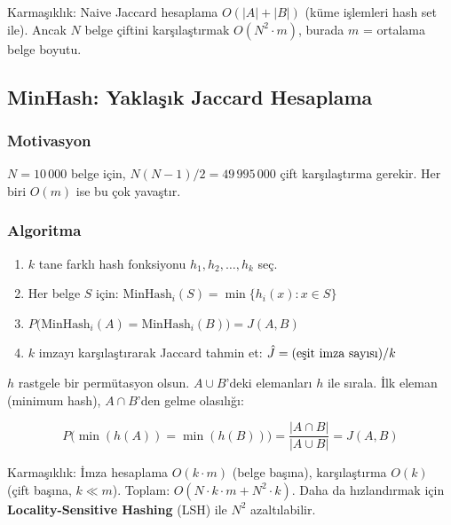 \noindent
Karma\c{s}{\i}kl{\i}k: Naive Jaccard hesaplama $O(|A| + |B|)$ (k\"{u}me i\c{s}lemleri hash set ile). Ancak $N$ belge \c{c}iftini kar\c{s}{\i}la\c{s}t{\i}rmak $O(N^2 \cdot m)$, burada $m$ = ortalama belge boyutu.


\subsection{MinHash: Yakla\c{s}{\i}k Jaccard Hesaplama}
\label{subsec:minhash}

\subsubsection{Motivasyon}

$N = 10\,000$ belge i\c{c}in, $N(N-1)/2 = 49\,995\,000$ \c{c}ift kar\c{s}{\i}la\c{s}t{\i}rma gerekir. Her biri $O(m)$ ise bu \c{c}ok yava\c{s}t{\i}r.

\subsubsection{Algoritma}

\begin{enumerate}
  \item $k$ tane farkl{\i} hash fonksiyonu $h_1, h_2, \ldots, h_k$ se\c{c}.
  \item Her belge $S$ i\c{c}in: $\text{MinHash}_i(S) = \min\{h_i(x) : x \in S\}$
  \item $P\!\big(\text{MinHash}_i(A) = \text{MinHash}_i(B)\big) = J(A, B)$
  \item $k$ imzay{\i} kar\c{s}{\i}la\c{s}t{\i}rarak Jaccard tahmin et: $\hat{J} = (\text{e\c{s}it imza say{\i}s{\i}}) / k$
\end{enumerate}

\begin{formulbox}
$h$ rastgele bir perm\"{u}tasyon olsun. $A \cup B$'deki elemanlar{\i} $h$ ile s{\i}rala. \.{I}lk eleman (minimum hash), $A \cap B$'den gelme olas{\i}l{\i}\u{g}{\i}:

\begin{equation}
P\!\big(\min(h(A)) = \min(h(B))\big) = \frac{|A \cap B|}{|A \cup B|} = J(A, B)
\label{eq:minhash-proof}
\end{equation}
\end{formulbox}

\noindent
Karma\c{s}{\i}kl{\i}k: \.{I}mza hesaplama $O(k \cdot m)$ (belge ba\c{s}{\i}na), kar\c{s}{\i}la\c{s}t{\i}rma $O(k)$ (\c{c}ift ba\c{s}{\i}na, $k \ll m$). Toplam: $O(N \cdot k \cdot m + N^2 \cdot k)$. Daha da h{\i}zland{\i}rmak i\c{c}in \textbf{Locality-Sensitive Hashing} (LSH) ile $N^2$ azalt{\i}labilir.


